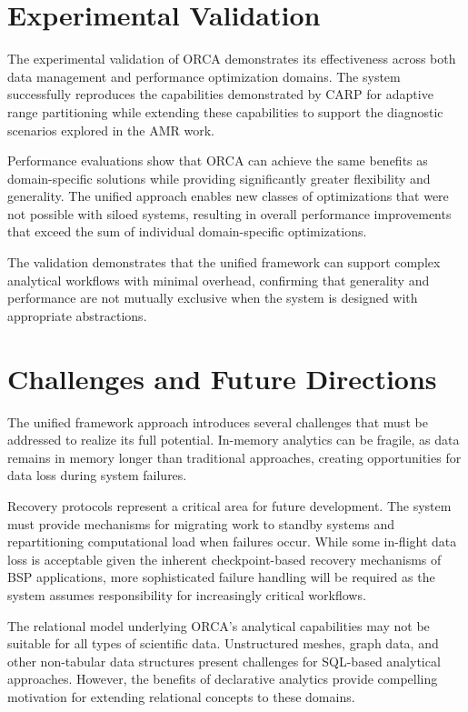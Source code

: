 \section{Experimental Validation}

The experimental validation of ORCA demonstrates its effectiveness across both data management
and performance optimization domains.
The system successfully reproduces the capabilities demonstrated by CARP for adaptive range
partitioning while extending these capabilities to support the diagnostic scenarios explored
in the AMR work.

Performance evaluations show that ORCA can achieve the same benefits as domain-specific solutions
while providing significantly greater flexibility and generality.
The unified approach enables new classes of optimizations that were not possible with siloed
systems, resulting in overall performance improvements that exceed the sum of individual
domain-specific optimizations.

The validation demonstrates that the unified framework can support complex analytical workflows
with minimal overhead, confirming that generality and performance are not mutually exclusive
when the system is designed with appropriate abstractions.

\section{Challenges and Future Directions}

The unified framework approach introduces several challenges that must be addressed to realize
its full potential.
In-memory analytics can be fragile, as data remains in memory longer than traditional approaches,
creating opportunities for data loss during system failures.

Recovery protocols represent a critical area for future development.
The system must provide mechanisms for migrating work to standby systems and repartitioning
computational load when failures occur.
While some in-flight data loss is acceptable given the inherent checkpoint-based recovery
mechanisms of BSP applications, more sophisticated failure handling will be required as the
system assumes responsibility for increasingly critical workflows.

The relational model underlying ORCA's analytical capabilities may not be suitable for all
types of scientific data.
Unstructured meshes, graph data, and other non-tabular data structures present challenges for
SQL-based analytical approaches.
However, the benefits of declarative analytics provide compelling motivation for extending
relational concepts to these domains.


